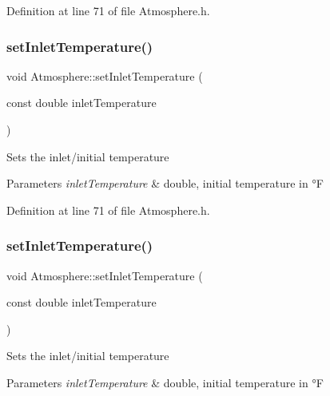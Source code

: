 Definition at line 71 of file Atmosphere.\+h.

\mbox{\label{class_atmosphere_a592bf7f82ea518fbd9da86d8f10cbc5c}} 
\subsubsection{\texorpdfstring{set\+Inlet\+Temperature()}{setInletTemperature()}\hspace{0.1cm}{\footnotesize\ttfamily [2/3]}}
{\footnotesize\ttfamily void Atmosphere\+::set\+Inlet\+Temperature (\begin{DoxyParamCaption}\item[{const double}]{inlet\+Temperature }\end{DoxyParamCaption})\hspace{0.3cm}{\ttfamily [inline]}}

Sets the inlet/initial temperature 
\begin{DoxyParams}{Parameters}
{\em inlet\+Temperature} & double, initial temperature in °F \\
\hline
\end{DoxyParams}


Definition at line 71 of file Atmosphere.\+h.

\mbox{\label{class_atmosphere_a592bf7f82ea518fbd9da86d8f10cbc5c}} 
\subsubsection{\texorpdfstring{set\+Inlet\+Temperature()}{setInletTemperature()}\hspace{0.1cm}{\footnotesize\ttfamily [3/3]}}
{\footnotesize\ttfamily void Atmosphere\+::set\+Inlet\+Temperature (\begin{DoxyParamCaption}\item[{const double}]{inlet\+Temperature }\end{DoxyParamCaption})\hspace{0.3cm}{\ttfamily [inline]}}

Sets the inlet/initial temperature 
\begin{DoxyParams}{Parameters}
{\em inlet\+Temperature} & double, initial temperature in °F \\
\hline
\end{DoxyParams}


